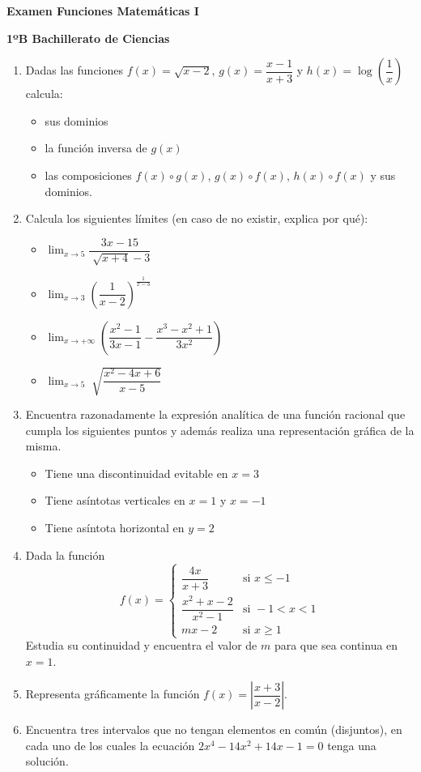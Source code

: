 \documentclass[11pt,a4paper]{article}
\begin{document}
\newpage
\centerline{{\Large \textbf{Examen Funciones Matemáticas I}}}
\centerline{{\Large \textbf{1ºB Bachillerato de Ciencias}}}

\begin{enumerate}
\item Dadas las funciones $f(x)=\sqrt{x-2}$, $g(x)=\dfrac{x-1}{x+3}$ y $h(x)=\log\left(\dfrac{1}{x}\right)$ calcula:
\begin{itemize}
     \item sus dominios
     \item la función inversa de $g(x)$
     \item las composiciones $f(x)\circ g(x)$, $g(x)\circ f(x)$, $h(x)\circ f(x)$ y sus dominios.
\end{itemize}

\item Calcula los siguientes límites (en caso de no existir, explica por qué):
\begin{itemize}
     \item $\displaystyle\lim_{x\rightarrow 5}\dfrac{3x-15}{\sqrt[]{x+4}-3}$
     \item $\displaystyle\lim_{x\rightarrow 3}\left(\dfrac{1}{x-2}\right)^{\frac{1}{x-3}}$
     \item $\displaystyle\lim_{x\rightarrow +\infty}\left(\dfrac{x^2-1}{3x-1}-\dfrac{x^3-x^2+1}{3x^2}\right)$
     \item $\displaystyle\lim_{x\rightarrow 5}\displaystyle\sqrt[]{\dfrac{x^2-4x+6}{x-5}}$
\end{itemize}


\item Encuentra razonadamente la expresión analítica de una función racional que cumpla los siguientes puntos y además realiza una representación gráfica de la misma.
\begin{itemize}
    \item Tiene una discontinuidad evitable en $x=3$
    \item Tiene asíntotas verticales en $x=1$ y $x=-1$
    \item Tiene asíntota horizontal en $y=2$
\end{itemize}

\item Dada la función
\begin{equation*}f(x)=\left\{
\begin{array}{rl}
\dfrac{4x}{x+3} & \text{si } x\leq -1 \\
\dfrac{x^2+x-2}{x^2-1} &\text{si } -1<x<1 \\
mx-2 & \text{si }x\geq 1
\end{array} 
\right.
\end{equation*}
Estudia su continuidad y encuentra el valor de $m$ para que sea continua en $x=1$.


\item Representa gráficamente la función $f(x)=\left|\dfrac{x+3}{x-2}\right|$.

\item Encuentra tres intervalos que no tengan elementos en común (disjuntos), en cada uno de los cuales la ecuación $2x^4-14x^2+14x-1=0$ tenga una solución.


\end{enumerate}
\end{document}
